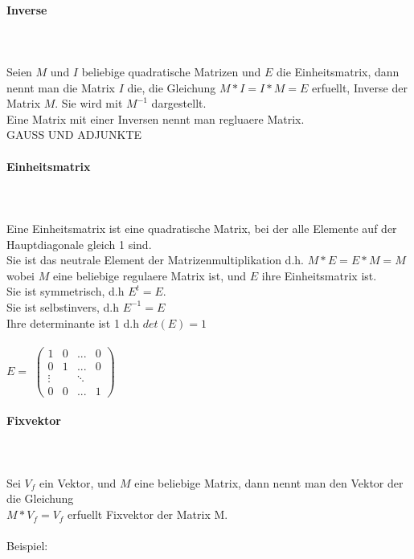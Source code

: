 \documentclass[a4paper]{article} %
\begin{document}
	\paragraph{Inverse  } 
	 \hspace{0 cm} \\ \noindent \\
	 Seien  $M$ und $I$ beliebige quadratische Matrizen und $E$ die Einheitsmatrix, dann nennt man die Matrix $I$ die, die Gleichung $M*I=I*M=E$ erfuellt, Inverse der Matrix $M$. Sie wird mit $M^{-1}$ dargestellt.\\
	 Eine Matrix mit einer Inversen nennt man regluaere Matrix.
	 \\GAUSS UND ADJUNKTE
	\paragraph{Einheitsmatrix} 
	 \hspace{0 cm} \\ \noindent \\ Eine Einheitsmatrix ist eine quadratische Matrix, bei der alle Elemente auf der Hauptdiagonale gleich 1 sind.\\
	Sie ist das neutrale Element der Matrizenmultiplikation d.h. $M*E = E*M = M$ wobei $M$ eine beliebige regulaere Matrix ist, und $E$ ihre Einheitsmatrix ist.\\
	Sie ist symmetrisch, d.h $E^{t}=E$.\\
	Sie ist selbstinvers, d.h $E^{-1}=E$\\
	Ihre determinante ist 1 d.h $det(E)=1$\\\\
	$E =$
		$
		\begin{pmatrix}
		1 & 0 	& ... 	& 0\\
		0 & 1 	& ...	& 0\\
		\vdots  &     	& \ddots  \\
		0 & 0	& ...	& 1
		\end{pmatrix}
		$\\

	\newpage
	\paragraph{Fixvektor}
		\hspace{0 cm} \\ \noindent \\
	Sei  $V_f$ ein Vektor, und $M$ eine beliebige Matrix, dann nennt man den Vektor der die Gleichung \\	$M * V_f = V_f$ erfuellt Fixvektor der Matrix M.\\\\
	Beispiel:
\end{document}
